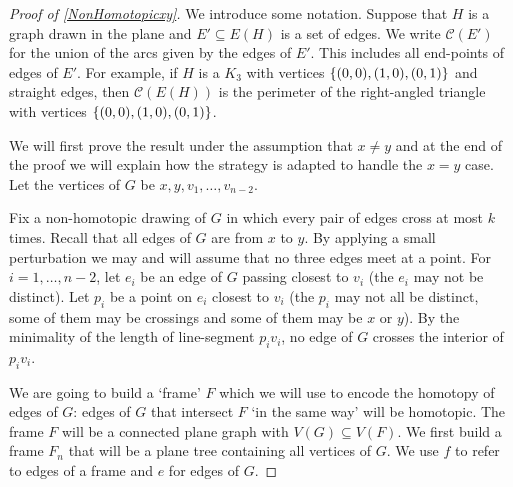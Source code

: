 \documentclass[a4paper,11pt]{article}
\DeclarePairedDelimiter{\set}{\lbrace}{\rbrace} %
\newcommand{\CC}{\mathcal{C}}
\begin{document}
\begin{proof}[Proof of \cref{NonHomotopicxy}]
We introduce some notation. Suppose that $H$ is a graph drawn in the plane and $E' \subseteq E(H)$ is a set of edges. We write $\CC(E')$ for the union of the arcs given by the edges of $E'$. This includes all end-points of edges of $E'$. For example, if $H$ is a $K_3$ with vertices $\set{(0,0), (1,0), (0,1)}$ and straight edges, then $\CC(E(H))$ is the perimeter of the right-angled triangle with vertices $\set{(0,0), (1,0), (0,1)}$.

We will first prove the result under the assumption that $x \neq y$ and at the end of the proof we will explain how the strategy is adapted to handle the $x = y$ case. Let the vertices of $G$ be $x, y, v_1, \dotsc, v_{n - 2}$.

Fix a non-homotopic drawing of $G$ in which every pair of edges cross at most $k$ times. Recall that all edges of $G$ are from $x$ to $y$. By applying a small perturbation we may and will assume that no three edges meet at a point. For $i = 1, \dotsc, n - 2$, let $e_i$ be an edge of $G$ passing closest to $v_i$ (the $e_i$ may not be distinct). Let $p_i$ be a point on $e_i$ closest to $v_i$ (the $p_i$ may not all be distinct, some of them may be crossings and some of them may be $x$ or $y$). By the minimality of the length of line-segment $p_i v_i$, no edge of $G$ crosses the interior of $p_i v_i$.

We are going to build a `frame' $F$ which we will use to encode the homotopy of edges of $G$: edges of $G$ that intersect $F$ `in the same way' will be homotopic. The frame $F$ will be a connected plane graph with $V(G) \subseteq V(F)$. We first build a frame $F_n$ that will be a plane tree containing all vertices of $G$. We use $f$ to refer to edges of a frame and $e$ for edges of $G$. 


\end{proof}
\end{document}
